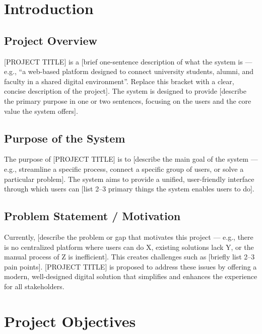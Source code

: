 \documentclass[12pt, a4paper]{article}
\begin{document}
\section{Introduction}

\subsection{Project Overview}

[PROJECT TITLE] is a [brief one-sentence description of what the system is --- e.g., ``a web-based platform designed to connect university students, alumni, and faculty in a shared digital environment''. Replace this bracket with a clear, concise description of the project]. The system is designed to provide [describe the primary purpose in one or two sentences, focusing on the users and the core value the system offers].

\subsection{Purpose of the System}

The purpose of [PROJECT TITLE] is to [describe the main goal of the system --- e.g., streamline a specific process, connect a specific group of users, or solve a particular problem]. The system aims to provide a unified, user-friendly interface through which users can [list 2--3 primary things the system enables users to do].

\subsection{Problem Statement / Motivation}

Currently, [describe the problem or gap that motivates this project --- e.g., there is no centralized platform where users can do X, existing solutions lack Y, or the manual process of Z is inefficient]. This creates challenges such as [briefly list 2--3 pain points]. [PROJECT TITLE] is proposed to address these issues by offering a modern, well-designed digital solution that simplifies and enhances the experience for all stakeholders.

\section{Project Objectives}
\end{document}
